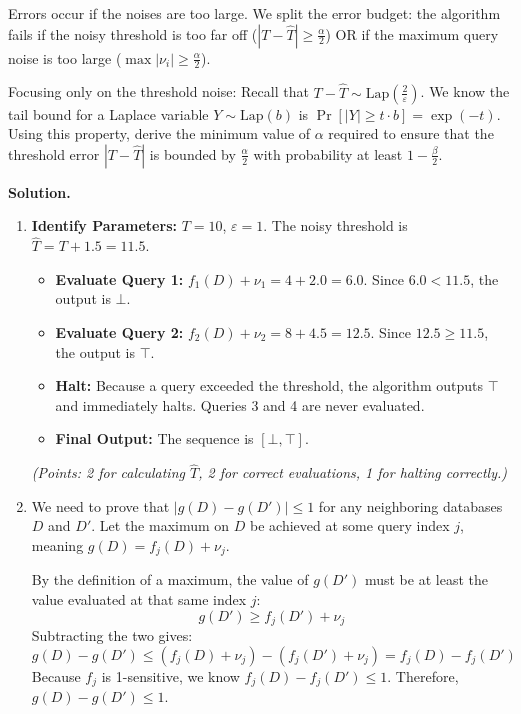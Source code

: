 \documentclass[12pt]{article}
\begin{document}
\begin{enumerate}
Errors occur if the noises are too large. We split the error budget: the algorithm fails if the noisy threshold is too far off ($|T - \hat{T}| \ge \frac{\alpha}{2}$) OR if the maximum query noise is too large ($\max |\nu_i| \ge \frac{\alpha}{2}$).

Focusing only on the threshold noise: Recall that $T - \hat{T} \sim \text{Lap}\left(\frac{2}{\varepsilon}\right)$. We know the tail bound for a Laplace variable $Y \sim \text{Lap}(b)$ is $\Pr[|Y| \ge t \cdot b] = \exp(-t)$. 
Using this property, derive the minimum value of $\alpha$ required to ensure that the threshold error $|T - \hat{T}|$ is bounded by $\frac{\alpha}{2}$ with probability at least $1 - \frac{\beta}{2}$.

\begin{solution}
\textbf{Solution.}\\
\begin{enumerate}
\item 
\textbf{Identify Parameters:} $T = 10$, $\varepsilon = 1$. The noisy threshold is $\hat{T} = T + 1.5 = 11.5$.
\begin{itemize}
    \item \textbf{Evaluate Query 1:} $f_1(D) + \nu_1 = 4 + 2.0 = 6.0$. Since $6.0 < 11.5$, the output is $\bot$.
    \item \textbf{Evaluate Query 2:} $f_2(D) + \nu_2 = 8 + 4.5 = 12.5$. Since $12.5 \ge 11.5$, the output is $\top$.
    \item \textbf{Halt:} Because a query exceeded the threshold, the algorithm outputs $\top$ and immediately halts. Queries 3 and 4 are never evaluated.
    \item \textbf{Final Output:} The sequence is $[\bot, \top]$.
\end{itemize}
\textit{(Points: 2 for calculating $\hat{T}$, 2 for correct evaluations, 1 for halting correctly.)}

\item 
We need to prove that $|g(D) - g(D')| \le 1$ for any neighboring databases $D$ and $D'$. Let the maximum on $D$ be achieved at some query index $j$, meaning $g(D) = f_j(D) + \nu_j$.

By the definition of a maximum, the value of $g(D')$ must be at least the value evaluated at that same index $j$:
$$g(D') \ge f_j(D') + \nu_j$$
Subtracting the two gives:
$$g(D) - g(D') \le (f_j(D) + \nu_j) - (f_j(D') + \nu_j) = f_j(D) - f_j(D')$$
Because $f_j$ is 1-sensitive, we know $f_j(D) - f_j(D') \le 1$. Therefore, $g(D) - g(D') \le 1$.


\end{enumerate}
\end{solution}
\end{enumerate}
\end{document}
